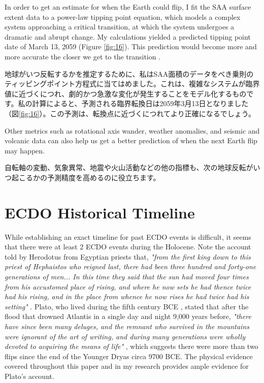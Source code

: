 \documentclass[10pt,twocolumn,letterpaper]{article}
\begin{document}
In order to get an estimate for when the Earth could flip, I fit the SAA surface extent data to a power-law tipping point equation, which models a complex system approaching a critical transition, at which the system undergoes a dramatic and abrupt change. My calculations yielded a predicted tipping point date of March 13, 2059 (Figure \ref{fig:16}). This prediction would become more and more accurate the closer we get to the transition \cite{136}.

地球がいつ反転するかを推定するために、私はSAA面積のデータをべき乗則のティッピングポイント方程式に当てはめました。これは、複雑なシステムが臨界値に近づくにつれ、劇的かつ急激な変化が発生することをモデル化するものです。私の計算によると、予測される臨界転換日は2059年3月13日となりました（図\ref{fig:16}）。この予測は、転換点に近づくにつれてより正確になるでしょう\cite{136}。

Other metrics such as rotational axis wander, weather anomalies, and seismic and volcanic data can also help us get a better prediction of when the next Earth flip may happen.

自転軸の変動、気象異常、地震や火山活動などの他の指標も、次の地球反転がいつ起こるかの予測精度を高めるのに役立ちます。

\section{ECDO Historical Timeline}

While establishing an exact timeline for past ECDO events is difficult, it seems that there were at least 2 ECDO events during the Holocene. Note the account told by Herodotus from Egyptian priests that, \textit{"from the first king down to this priest of Hephaistos who reigned last, there had been three hundred and forty-one generations of men... In this time they said that the sun had moved four times from his accustomed place of rising, and where he now sets he had thence twice had his rising, and in the place from whence he now rises he had twice had his setting"} \cite{32}. Plato, who lived during the fifth century BCE \cite{111}, stated that after the flood that drowned Atlantis in a single day and night 9,000 years before, \textit{"there have since been many deluges, and the remnant who survived in the mountains were ignorant of the art of writing, and during many generations were wholly devoted to acquiring the means of life"} \cite{112}, which suggests there were more than two flips since the end of the Younger Dryas circa 9700 BCE. The physical evidence covered throughout this paper and in my research \cite{2} provides ample evidence for Plato's account.
\end{document}
